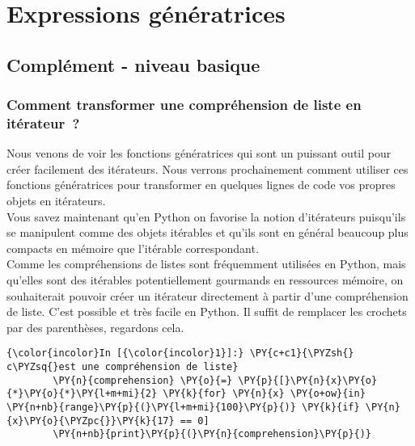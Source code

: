     \hypertarget{expressions-guxe9nuxe9ratrices}{%
\section{Expressions
génératrices}\label{expressions-guxe9nuxe9ratrices}}

    \hypertarget{compluxe9ment---niveau-basique}{%
\subsection{Complément - niveau
basique}\label{compluxe9ment---niveau-basique}}

    \hypertarget{comment-transformer-une-compruxe9hension-de-liste-en-ituxe9rateur}{%
\subsubsection{Comment transformer une compréhension de liste en
itérateur~?}\label{comment-transformer-une-compruxe9hension-de-liste-en-ituxe9rateur}}

    Nous venons de voir les fonctions génératrices qui sont un puissant
outil pour créer facilement des itérateurs. Nous verrons prochainement
comment utiliser ces fonctions génératrices pour transformer en quelques
lignes de code vos propres objets en itérateurs.\\

Vous savez maintenant qu'en Python on favorise la notion d'itérateurs
puisqu'ils se manipulent comme des objets itérables et qu'ils sont en
général beaucoup plus compacts en mémoire que l'itérable correspondant.\\

Comme les compréhensions de listes sont fréquemment utilisées en Python,
mais qu'elles sont des itérables potentiellement gourmands en ressources
mémoire, on souhaiterait pouvoir créer un itérateur directement à partir
d'une compréhension de liste. C'est possible et très facile en Python.
Il suffit de remplacer les crochets par des parenthèses, regardons cela.

    \begin{Verbatim}[commandchars=\\\{\}]
{\color{incolor}In [{\color{incolor}1}]:} \PY{c+c1}{\PYZsh{} c\PYZsq{}est une compréhension de liste}
        \PY{n}{comprehension} \PY{o}{=} \PY{p}{[}\PY{n}{x}\PY{o}{*}\PY{o}{*}\PY{l+m+mi}{2} \PY{k}{for} \PY{n}{x} \PY{o+ow}{in} \PY{n+nb}{range}\PY{p}{(}\PY{l+m+mi}{100}\PY{p}{)} \PY{k}{if} \PY{n}{x}\PY{o}{\PYZpc{}}\PY{k}{17} == 0] 
        \PY{n+nb}{print}\PY{p}{(}\PY{n}{comprehension}\PY{p}{)}
\end{Verbatim}


